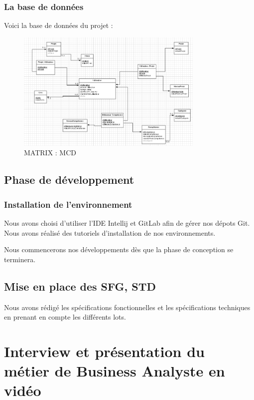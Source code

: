 \subsubsection{La base de données}

Voici la base de données du projet :
\begin{figure}[H]
\centering
\includegraphics[width=0.8\textwidth]{images/matrix-bdd.png}
\caption{MATRIX : MCD}
\end{figure}

\subsection{Phase de développement}

\subsubsection{Installation de l’environnement}
Nous avons choisi d'utiliser l'IDE Intellij et GitLab afin de gérer nos dépots Git. Nous avons réalisé des tutoriels d'installation de nos environnements.

Nous commencerons nos développements dès que la phase de conception se terminera.

\subsection{Mise en place des SFG, STD}

Nous avons rédigé les spécifications fonctionnelles et les spécifications techniques en prenant en compte les différents lots. 

\section{Interview et présentation du métier de Business Analyste en vidéo}

